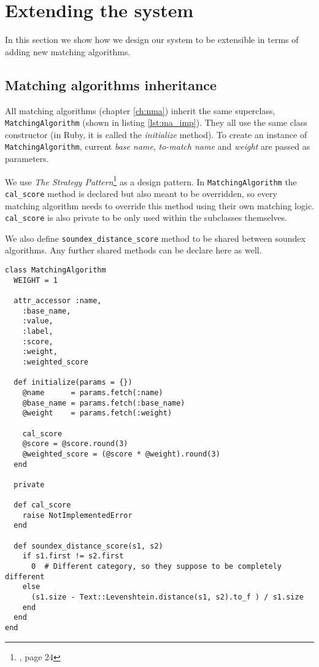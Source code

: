 \chapter{Extending the system}

In this section we show how we design our system to be extensible
in terms of adding new matching algorithms.

\section{Matching algorithms inheritance}

All matching algorithms (chapter \ref{ch:nma}) inherit the same superclass,\\
\texttt{MatchingAlgorithm} (shown in listing \ref{lst:ma_imp}). They all use the same class constructor
(in Ruby, it is called the \emph{initialize} method). To create an instance
of \texttt{MatchingAlgorithm}, current \emph{base name}, \emph{to-match name}
and \emph{weight} are passed as parameters.

We use \emph{The Strategy Pattern}\footnote{\cite[]{hf}, page 24}
as a design pattern. In \texttt{MatchingAlgorithm} the \texttt{cal\_score} method
is declared but also meant to be overridden, so every matching
algorithm needs to override this method using their own matching logic.
\texttt{cal\_score} is also private to be only used within the subclasses
themselves.

We also define \texttt{soundex\_distance\_score} method to be shared
between soundex algorithms. Any further shared methods can be declare
here as well.

\begin{minipage}{\linewidth}
\begin{lstlisting}[label={lst:ma_imp}, caption={\texttt{MatchingAlgorithm} class.}]
class MatchingAlgorithm
  WEIGHT = 1

  attr_accessor :name,
    :base_name,
    :value,
    :label,
    :score,
    :weight,
    :weighted_score

  def initialize(params = {})
    @name      = params.fetch(:name)
    @base_name = params.fetch(:base_name)
    @weight    = params.fetch(:weight)

    cal_score
    @score = @score.round(3)
    @weighted_score = (@score * @weight).round(3)
  end

  private

  def cal_score
    raise NotImplementedError
  end

  def soundex_distance_score(s1, s2)
    if s1.first != s2.first
      0  # Different category, so they suppose to be completely different
    else
      (s1.size - Text::Levenshtein.distance(s1, s2).to_f ) / s1.size
    end
  end
end
\end{lstlisting}
\end{minipage}

